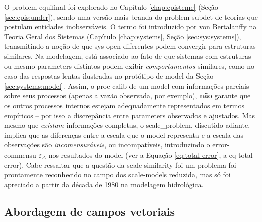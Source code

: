 \documentclass[./main.tex]{subfiles}
\begin{document}
\par O \gls{problem-equifinal} foi explorado no Capítulo \ref{chap:episteme} (Seção \ref{sec:epis:under}), sendo uma versão mais branda do \gls{problem-subdet} de teorias que postulam entidades inobserváveis. O termo  foi introduzido por von Bertalanffy na Teoria Geral dos Sistemas (Capítulo \ref{chap:systems}, Seção \ref{sec:sys:systems}), transmitindo a noção de que \gls{sys-open} diferentes podem convergir para estruturas similares. Na modelagem, está associado ao fato de que sistemas com estruturas ou mesmo \gls{parameters} distintos podem exibir \textit{comportamentos} similares, como no caso das respostas lentas ilustradas no protótipo de \gls{model} da Seção \ref{sec:systems:model}. Assim, o \gls{proc-calib} de um \gls{model} com informações parciais sobre seus processos (apenas a vazão observada, por exemplo), \textbf{não} garante que os outros processos internos estejam adequadamente representados em termos empíricos -- por isso a discrepância entre \gls{parameters} observados e ajustados. Mas mesmo que \textit{existam} informações completas, o \gls{scale_problem}, discutido adiante, implica que as diferenças entre a escala que o \gls{model} representa e a escala das observações são \textit{incomensuráveis}, ou incompatíveis, introduzindo o \gls{error-commensu} $\varepsilon_{\Delta}$ nos resultados do \gls{model} (ver a Equação \eqref{eq:total-error}, a \gls{eq-total-error}). Cabe ressaltar que a questão da \gls{scale-similarity} foi um problema foi prontamente reconhecido no campo dos \gls{scale-models} reduzida, mas só foi apreciado a partir da década de 1980 na modelagem hidrológica.

\subsection{Abordagem de campos vetoriais} \label{sec:hydro:physical}
\end{document}
